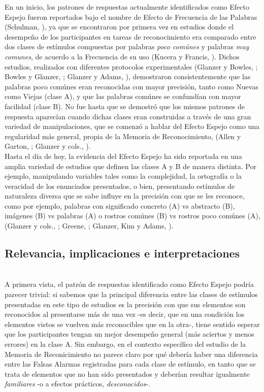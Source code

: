En un inicio, los patrones de respuestas actualmente identificados como Efecto Espejo fueron reportados bajo el nombre de Efecto de Frecuencia de las Palabras (Schulman, \citeyear{Schulman1967}), ya que se encontraron por primera vez en estudios donde el desempeño de los participantes en tareas de reconocimiento era comparado entre dos clases de estímulos compuestas por palabras \textit{poco comúnes} y palabras \textit{muy comunes}, de acuerdo a la Frecuencia de su uso (Kucera y Francis, \citeyear{Kucera1967}). Dichos estudios, realizados con diferentes protocolos experimentales (Glanzer y Bowles, \citeyear{Glanzer1976}; Bowles y Glanzer, \citeyear{Bowles1983}; Glanzer y Adams, \citeyear{Glanzer1990}), demostraron consistentemente que las palabras poco comúnes eran reconocidas con mayor precisión, tanto como Nuevas como Viejas (clase A), y que las palabras comúnes se confundían con mayor facilidad (clase B). No fue hasta que se demostró que los mismos patrones de respuesta aparecían cuando dichas clases eran construidas a través de una gran variedad de manipulaciones, que se comenzó a hablar del Efecto Espejo como una regularidad más general, propia de la Memoria de Reconocimiento, (Allen y Garton, \citeyear{Allen1968}; Glanzer y cols., \citeyear{Glanzer1993}).\\

Hasta el día de hoy, la evidencia del Efecto Espejo ha sido reportada en una amplia variedad de estudios que definen las clases A y B de manera distinta. Por ejemplo, manipulando variables tales como la complejidad, la ortografía o la veracidad de los enunciados presentados, o bien, presentando estímulos de naturaleza diversa que se sabe influye en la precisión con que se les reconoce, como por ejemplo, palabras con significado concreto (A) vs abstracto (B), imágenes (B) vs palabras (A) o rostros comúnes (B) vs rostros poco comúnes (A), (Glanzer y cols., \citeyear{Glanzer1993}; Greene, \citeyear{Greene1996}; Glanzer, Kim y Adams, \citeyear{Glanzer1998}).\\

\subsection{Relevancia, implicaciones e interpretaciones}\\

A primera vista, el patrón de respuestas identificado como Efecto Espejo podría parecer trivial: si sabemos que la principal diferencia entre las clases de estímulos presentadas en este tipo de estudios es la precisión con que sus elementos son reconocidos al presentarse más de una vez -es decir, que en una condición los elementos vistos se vuelven más reconocibles que en la otra-, tiene sentido esperar que los participantes tengan un mejor desempeño general (más aciertos y menos errores) en la clase A. Sin embargo, en el contexto específico del estudio de la Memoria de Reconicimiento no parece claro por qué debería haber una diferencia entre las Falsas Alarmas registradas para cada clase de estímulo, en tanto que se trata de elementos que no han sido presentados y deberían resultar igualmente \textit{familiares} -o a efectos prácticos, \textit{desconocidos}-.\\

